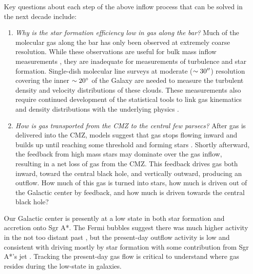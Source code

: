 \documentclass[modern]{aastex62}
\def\agnote#1{{\color{red}#1}}
\begin{document}
Key questions about each step of the above inflow process that can be solved in
the next decade include:
\begin{enumerate}
    \item 
\textit{Why is the star formation efficiency low in gas along the bar?}
Much of the molecular gas along the bar has only been observed at extremely
coarse resolution. While these observations are useful for bulk mass inflow
measurements \citep[e.g.,][]{Sormani2019a}, they are inadequate for
measurements of turbulence and star formation. Single-dish molecular line
surveys at moderate
($\sim30\mbox{$^{\prime\prime}$}$) resolution covering the inner $\sim20^{\circ}$ of the Galaxy are
needed to measure the turbulent density and velocity distributions of these
clouds. These measurements also require continued development of the
statistical tools to link gas kinematics and density distributions with the
underlying physics \citep{Koch2017a,Burkhart2018a}.

%

    \item 
\textit{How is gas transported from the CMZ to the central few parsecs?}
After gas is delivered into the CMZ, models suggest that gas stops flowing
inward and builds up until reaching some threshold and forming stars
\citep{Kruijssen2014c,Krumholz2017a,Sormani2018b,Jeffreson2018b}.  Shortly
afterward, the feedback from high mass stars may dominate over the gas inflow,
resulting in a net loss of gas from the CMZ.  This feedback drives gas both
inward, toward the central black hole, and vertically outward, producing an
outflow. How much of this gas is turned into stars, how much is driven out of
the Galactic center by feedback, and how much is driven towards the central
black hole?
\end{enumerate}

Our Galactic center is presently at a low state in both star formation and
accretion onto Sgr A*.  The Fermi bubbles suggest there was much higher
activity in the not too distant past \citep{Su2010a}, but the present-day
outflow activity is low and consistent with driving mostly by star formation
\citep{Law2009a,Law2010a} with some contribution from Sgr A*'s jet
\citep{Muno2008a,Li2013a,Zhu2018a}. Tracking the present-day gas flow is critical
to understand where gas resides during the low-state in galaxies.
\end{document}
